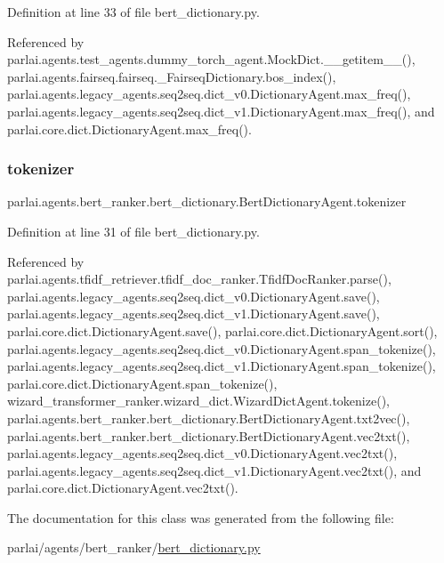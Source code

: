 Definition at line 33 of file bert\+\_\+dictionary.\+py.



Referenced by parlai.\+agents.\+test\+\_\+agents.\+dummy\+\_\+torch\+\_\+agent.\+Mock\+Dict.\+\_\+\+\_\+getitem\+\_\+\+\_\+(), parlai.\+agents.\+fairseq.\+fairseq.\+\_\+\+Fairseq\+Dictionary.\+bos\+\_\+index(), parlai.\+agents.\+legacy\+\_\+agents.\+seq2seq.\+dict\+\_\+v0.\+Dictionary\+Agent.\+max\+\_\+freq(), parlai.\+agents.\+legacy\+\_\+agents.\+seq2seq.\+dict\+\_\+v1.\+Dictionary\+Agent.\+max\+\_\+freq(), and parlai.\+core.\+dict.\+Dictionary\+Agent.\+max\+\_\+freq().

\mbox{\label{classparlai_1_1agents_1_1bert__ranker_1_1bert__dictionary_1_1BertDictionaryAgent_a255b3fa65375a03d2e74e0c2b2cc0fad}} 
\subsubsection{\texorpdfstring{tokenizer}{tokenizer}}
{\footnotesize\ttfamily parlai.\+agents.\+bert\+\_\+ranker.\+bert\+\_\+dictionary.\+Bert\+Dictionary\+Agent.\+tokenizer}



Definition at line 31 of file bert\+\_\+dictionary.\+py.



Referenced by parlai.\+agents.\+tfidf\+\_\+retriever.\+tfidf\+\_\+doc\+\_\+ranker.\+Tfidf\+Doc\+Ranker.\+parse(), parlai.\+agents.\+legacy\+\_\+agents.\+seq2seq.\+dict\+\_\+v0.\+Dictionary\+Agent.\+save(), parlai.\+agents.\+legacy\+\_\+agents.\+seq2seq.\+dict\+\_\+v1.\+Dictionary\+Agent.\+save(), parlai.\+core.\+dict.\+Dictionary\+Agent.\+save(), parlai.\+core.\+dict.\+Dictionary\+Agent.\+sort(), parlai.\+agents.\+legacy\+\_\+agents.\+seq2seq.\+dict\+\_\+v0.\+Dictionary\+Agent.\+span\+\_\+tokenize(), parlai.\+agents.\+legacy\+\_\+agents.\+seq2seq.\+dict\+\_\+v1.\+Dictionary\+Agent.\+span\+\_\+tokenize(), parlai.\+core.\+dict.\+Dictionary\+Agent.\+span\+\_\+tokenize(), wizard\+\_\+transformer\+\_\+ranker.\+wizard\+\_\+dict.\+Wizard\+Dict\+Agent.\+tokenize(), parlai.\+agents.\+bert\+\_\+ranker.\+bert\+\_\+dictionary.\+Bert\+Dictionary\+Agent.\+txt2vec(), parlai.\+agents.\+bert\+\_\+ranker.\+bert\+\_\+dictionary.\+Bert\+Dictionary\+Agent.\+vec2txt(), parlai.\+agents.\+legacy\+\_\+agents.\+seq2seq.\+dict\+\_\+v0.\+Dictionary\+Agent.\+vec2txt(), parlai.\+agents.\+legacy\+\_\+agents.\+seq2seq.\+dict\+\_\+v1.\+Dictionary\+Agent.\+vec2txt(), and parlai.\+core.\+dict.\+Dictionary\+Agent.\+vec2txt().



The documentation for this class was generated from the following file\+:\begin{DoxyCompactItemize}
\item 
parlai/agents/bert\+\_\+ranker/\hyperlink{bert__dictionary_8py}{bert\+\_\+dictionary.\+py}\end{DoxyCompactItemize}
